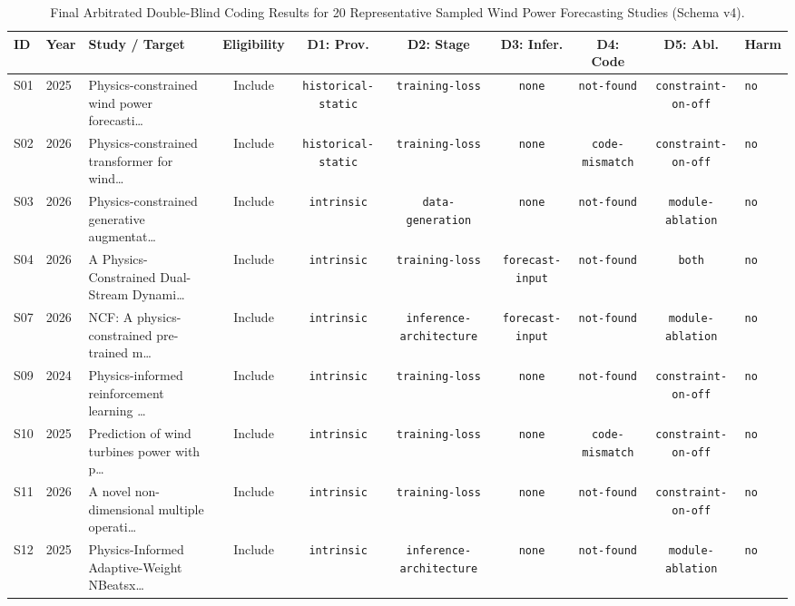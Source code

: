 \begin{table}[!t]
\centering
\scriptsize
\caption{Final Arbitrated Double-Blind Coding Results for 20 Representative Sampled Wind Power Forecasting Studies (Schema v4).}
\label{tab:arbitrated_20}
\begin{tabularx}{\textwidth}{llp{4.2cm}cccccc}
\toprule
\textbf{ID} & \textbf{Year} & \textbf{Study / Target} & \textbf{Eligibility} & \textbf{D1: Prov.} & \textbf{D2: Stage} & \textbf{D3: Infer.} & \textbf{D4: Code} & \textbf{D5: Abl.} & \textbf{Harm} \\
\midrule
S01 & 2025 & Physics-constrained wind power forecasti\dots & Include & \texttt{historical-static} & \texttt{training-loss} & \texttt{none} & \texttt{not-found} & \texttt{constraint-on-off} & \texttt{no} \\
S02 & 2026 & Physics-constrained transformer for wind\dots & Include & \texttt{historical-static} & \texttt{training-loss} & \texttt{none} & \texttt{code-mismatch} & \texttt{constraint-on-off} & \texttt{no} \\
S03 & 2026 & Physics-constrained generative augmentat\dots & Include & \texttt{intrinsic} & \texttt{data-generation} & \texttt{none} & \texttt{not-found} & \texttt{module-ablation} & \texttt{no} \\
S04 & 2026 & A Physics-Constrained Dual-Stream Dynami\dots & Include & \texttt{intrinsic} & \texttt{training-loss} & \texttt{forecast-input} & \texttt{not-found} & \texttt{both} & \texttt{no} \\
S07 & 2026 & NCF: A physics-constrained pre-trained m\dots & Include & \texttt{intrinsic} & \texttt{inference-architecture} & \texttt{forecast-input} & \texttt{not-found} & \texttt{module-ablation} & \texttt{no} \\
S09 & 2024 & Physics-informed reinforcement learning \dots & Include & \texttt{intrinsic} & \texttt{training-loss} & \texttt{none} & \texttt{not-found} & \texttt{constraint-on-off} & \texttt{no} \\
S10 & 2025 & Prediction of wind turbines power with p\dots & Include & \texttt{intrinsic} & \texttt{training-loss} & \texttt{none} & \texttt{code-mismatch} & \texttt{constraint-on-off} & \texttt{no} \\
S11 & 2026 & A novel non-dimensional multiple operati\dots & Include & \texttt{intrinsic} & \texttt{training-loss} & \texttt{none} & \texttt{not-found} & \texttt{constraint-on-off} & \texttt{no} \\
S12 & 2025 & Physics-Informed Adaptive-Weight NBeatsx\dots & Include & \texttt{intrinsic} & \texttt{inference-architecture} & \texttt{none} & \texttt{not-found} & \texttt{module-ablation} & \texttt{no} \\

\end{tabularx}
\end{table}
